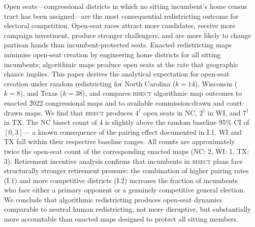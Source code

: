 Open seats---congressional districts in which no sitting incumbent's home census tract
has been assigned---are the most consequential redistricting outcome for electoral
competition. Open-seat races attract more candidates, receive more campaign investment,
produce stronger challengers, and are more likely to change partisan hands than
incumbent-protected seats. Enacted redistricting maps minimise open-seat creation by
engineering home districts for all sitting incumbents; algorithmic maps produce open
seats at the rate that geographic chance implies. This paper derives the analytical
expectation for open-seat creation under random redistricting for North Carolina
($k=14$), Wisconsin ($k=8$), and Texas ($k=38$), and compares \textsc{bisect}
algorithmic map outcomes to enacted 2022 congressional maps and to available
commission-drawn and court-drawn maps. We find that \textsc{bisect} produces
$4^\dagger$ open seats in NC, $2^\dagger$ in WI, and $7^\dagger$ in TX.
The NC bisect count of 4 is slightly above the random baseline 95\% CI of $[0,3]$---
a known consequence of the pairing effect documented in I.1. WI and TX fall within
their respective baseline ranges. All counts are approximately twice the open-seat
count of the corresponding enacted maps (NC: 2, WI: 1, TX: 3). Retirement incentive
analysis confirms that incumbents in \textsc{bisect} plans face structurally stronger
retirement pressure: the combination of higher pairing rates (I.1) and more competitive
districts (I.2) increases the fraction of incumbents who face either a primary opponent
or a genuinely competitive general election. We conclude that algorithmic redistricting
produces open-seat dynamics comparable to neutral human redistricting, not more
disruptive, but substantially more accountable than enacted maps designed to protect
all sitting members.
